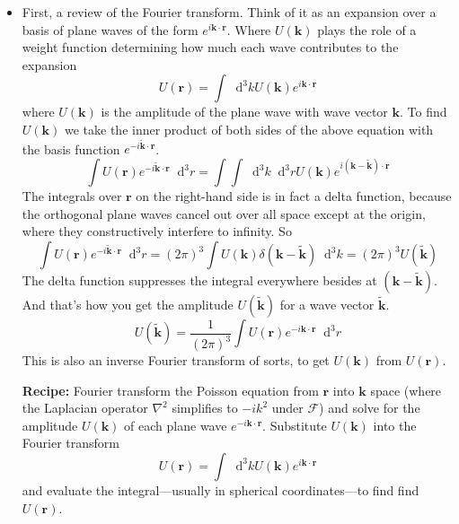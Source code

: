 \documentclass[11pt, a4paper]{article}
\newcommand{\diff}{\mathop{}\!\mathrm{d}} %
\renewcommand{\vec}[1]{\bm{#1}} %
\newcommand{\tvec}[1]{\tilde{\vec{#1}}} %
\renewcommand{\r}{\vec{r}}
\renewcommand{\laplacian}{\nabla^{2}}
\begin{document}
\begin{itemize}
	\item First, a review of the Fourier transform. Think of it as an expansion over a basis of plane waves of the form $ e^{i \vec{k} \cdot \r} $. Where $ U(\vec{k}) $ plays the role of a weight function determining how much each wave contributes to the expansion
	\begin{equation*}
		U(\r) = \int \diff^{3}k U(\vec{k}) e^{i \vec{k}\cdot \r}
	\end{equation*}
	where $ U(\vec{k}) $ is the amplitude of the plane wave with wave vector $ \vec{k} $. To find $ U(\vec{k}) $ we take the inner product of both sides of the above equation with the basis function $ e^{-i \tvec{k}\cdot\r} $. 
	\begin{equation*}
		\int U(\r) e^{-i \tvec{k}\cdot \r} \diff^{3}r = \int \int \diff^{3}k \diff^{3}r U(\vec{k}) e^{i (\vec{k} - \tvec{k})\cdot \r}
	\end{equation*}
	The integrals over $ \r $ on the right-hand side is in fact a delta function, because the orthogonal plane waves cancel out over all space except at the origin, where they constructively interfere to infinity. So 
	\begin{equation*}
		\int U(\r) e^{-i \tvec{k}\cdot \r} \diff^{3}r = (2\pi)^{3} \int U(\vec{k}) \delta (\vec{k} - \tvec{k}) \diff^{3}k = (2\pi)^{3} U(\tvec{k})
	\end{equation*}
	The delta function suppresses the integral everywhere besides at $ (\vec{k} - \tvec{k}) $. And that's how you get the amplitude $ U(\tvec{k}) $ for a wave vector $ \tvec{k} $. 
	\begin{equation*}
		U(\tvec{k}) = \frac{1}{(2\pi)^{3}} \int U(\r) e^{-i\vec{k}\cdot \r} \diff^{3}r
	\end{equation*}
	This is also an inverse Fourier transform of sorts, to get $ U(\vec{k}) $ from $ U(\r) $.
	
	\textbf{Recipe:} Fourier transform the Poisson equation from $ \r $ into $ \vec{k} $ space (where the Laplacian operator $ \laplacian $ simplifies to $ -ik^{2} $ under $ \mathcal{F} $) and solve for the amplitude $ U(\vec{k}) $ of each plane wave $ e^{-i\vec{k}\cdot \r} $. Substitute $ U(\vec{k}) $ into the Fourier transform
	\begin{equation*}
		U(\r) = \int \diff^{3}k U(\vec{k}) e^{i \vec{k}\cdot \r}
	\end{equation*}
	and evaluate the integral---usually in spherical coordinates---to find find $ U(\r) $. 
	

\end{itemize}
\end{document}
